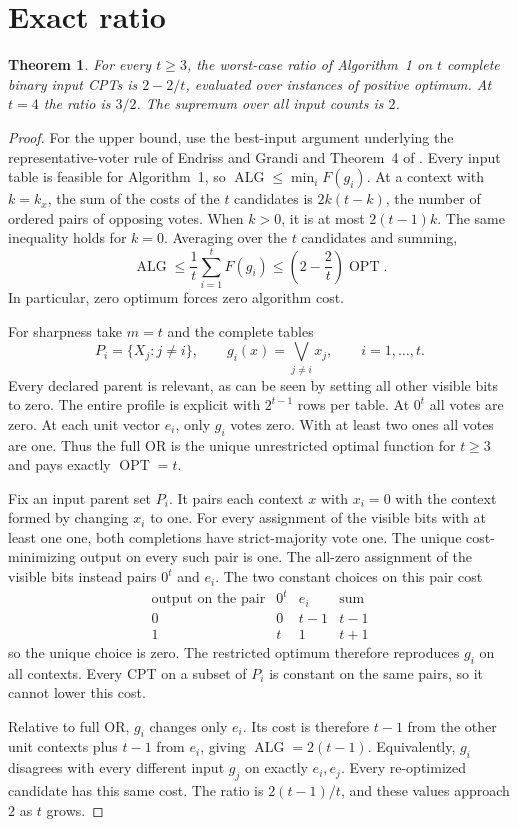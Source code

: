 \documentclass[11pt]{amsart}
\newtheorem{theorem}{Theorem}
\newcommand{\OPT}{\operatorname{OPT}}
\newcommand{\Alg}{\operatorname{ALG}}
\begin{document}
\section{Exact ratio}
\begin{theorem}
For every \(t\ge 3\), the worst-case ratio of Algorithm~1 on
\(t\) complete binary input CPTs is \(2-2/t\), evaluated over
instances of positive optimum. At \(t=4\) the ratio is \(3/2\).
The supremum over all input counts is \(2\).
\end{theorem}

\begin{proof}
For the upper bound, use the best-input argument underlying the
representative-voter rule of Endriss and Grandi \cite{eg}
and Theorem~4 of \cite{ayz}. Every input table is feasible for
Algorithm~1, so \(\Alg\le \min_i F(g_i)\). At a context with
\(k=k_x\), the sum of the costs of the \(t\) candidates is
\(2k(t-k)\), the number of ordered pairs of opposing votes. When
\(k>0\), it is at most \(2(t-1)k\). The same inequality holds for
\(k=0\). Averaging over the \(t\) candidates and summing,
\[
  \Alg \le \frac{1}{t}\sum_{i=1}^t F(g_i)
       \le \left(2-\frac{2}{t}\right) \OPT .
\]
In particular, zero optimum forces zero algorithm cost.

For sharpness take \(m=t\) and the complete tables
\[
       P_i=\{X_j:j\ne i\},\qquad
       g_i(x)=\bigvee_{j\ne i} x_j,\qquad i=1,\ldots,t .
\]
Every declared parent is relevant, as can be seen by setting all
other visible bits to zero. The entire profile is explicit with
\(2^{t-1}\) rows per table. At \(0^t\) all votes are zero. At each
unit vector \(e_i\), only \(g_i\) votes zero. With at least two
ones all votes are one. Thus the full OR is the unique unrestricted
optimal function for \(t\ge 3\) and pays exactly \(\OPT=t\).

Fix an input parent set \(P_i\). It pairs each context \(x\)
with \(x_i=0\) with the context formed by changing \(x_i\) to one.
For every assignment of the visible bits with at least one one,
both completions have strict-majority vote one. The unique
cost-minimizing output on every such pair is one. The all-zero
assignment of the visible bits instead pairs \(0^t\) and \(e_i\).
The two constant choices on this pair cost
\[
\begin{array}{c|cc|c}
\text{output on the pair} & 0^t & e_i & \text{sum}\\ \hline
0 & 0 & t-1 & t-1\\
1 & t & 1   & t+1
\end{array}
\]
so the unique choice is zero. The restricted optimum therefore
reproduces \(g_i\) on all contexts. Every CPT on a subset of \(P_i\)
is constant on the same pairs, so it cannot lower this cost.

Relative to full OR, \(g_i\) changes only \(e_i\). Its cost is
therefore \(t-1\) from the other unit contexts plus \(t-1\) from
\(e_i\), giving \(\Alg=2(t-1)\). Equivalently, \(g_i\) disagrees
with every different input \(g_j\) on exactly \(e_i,e_j\).
Every re-optimized candidate has this same cost. The ratio
is \(2(t-1)/t\), and these values approach \(2\) as \(t\) grows.
\end{proof}
\end{document}

